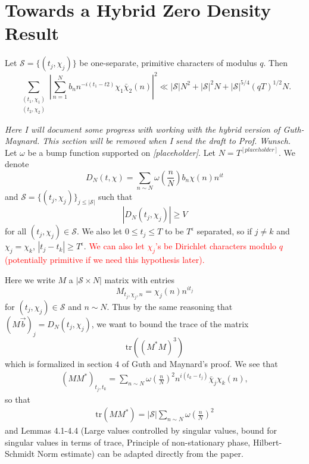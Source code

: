 \section{Towards a Hybrid Zero Density Result}
\begin{theorem}
    Let $\mathcal{S}=\{(t_j,\chi_j)\}$ be one-separate, primitive characters of modulus $q$. Then 
    \[
        \sum_{\substack{(t_1,\chi_1)\\(t_2,\chi_2)}}\left|\sum_{n=1}^{N} b_n n^{-i(t_1-t2)}\chi_1\bar{\chi}_2(n)\right|^2 \ll  |\mathcal{S}|N^2+ |\mathcal{S}|^2N + |\mathcal{S}|^{5/4}(qT)^{1/2}N.
    \]
\end{theorem}
\textit{Here I will document some progress with working with
the hybrid version of Guth-Maynard. This section will be removed when I send the draft to Prof. Wunsch.}
Let $\omega$ be a bump function supported on \textit{[placeholder]}. Let $N=T^{[placeholder]}$. We denote \[
D_N(t,\chi) = \sum_{n\sim N} \omega\left(\frac{n}{N}\right)b_n \chi(n) n^{it}
\]
and $\mathcal{S}=\{(t_j,\chi_j)\}_{j\leq |\mathcal{S}|}$ such that 
\[
    |D_N(t_j,\chi_j)|\geq V
\]
for all $(t_j,\chi_j)\in\mathcal{S}$.
We also let $0\leq t_j\leq T$ to be $T^\epsilon$ separated, so if 
$j\neq k$ and $\chi_j=\chi_k$, $|t_j-t_k|\geq T^\epsilon$. \textcolor{red}{We can also
let $\chi_j$'s be Dirichlet characters modulo $q$ (potentially primitive if we need this hypothesis later).}

Here we write $M$ a $|\mathcal{S}\times N|$ matrix with entries
\[
    M_{t_j,\chi_j,n} = \chi_j(n)n^{it_j}
\]
for $(t_j,\chi_j)\in\mathcal{S}$ and $n\sim N$.
Thus by the same reasoning that $(M\vec{b})_j=D_N(t_j,\chi_j)$,
we want to bound the trace of the matrix \[
\textrm{tr}((M^*M)^3)
\]
which is formalized in section $4$ of Guth and Maynard's proof.
We see that \begin{align*}
    (MM^*)_{t_j,t_k} = \sum_{n\sim N} \omega\left(\frac{n}{N}\right)^2 n^{i(t_k-t_j)}\bar{\chi}_j\chi_k(n),
\end{align*}
so that \begin{align*}
    \textrm{tr}(MM^*) = |\mathcal{S}|\sum_{n\sim N} \omega\left(\frac{n}{N}\right)^2
\end{align*}
and Lemmas 4.1-4.4 (Large values controlled by singular values, bound for singular values in terms of trace,
Principle of non-stationary phase, Hilbert-Schmidt Norm estimate) can be adapted directly from the paper.

